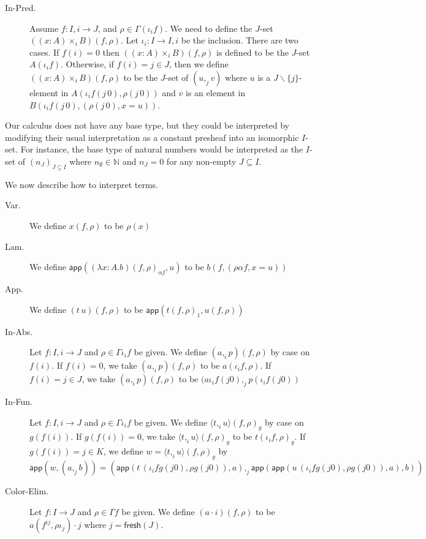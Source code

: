 \documentclass[english]{PaperTools/latex/lipics}
\newcommand\CTimes[2]{(#2) ×_{#1}}
\newcommand\param[1]{\!\cdot\!#1}
\newcommand\fp[3]{⟨#2 ,_{#1} #3⟩}
\def\fresh#1{\mathsf{fresh}(#1)}
\def\app#1#2{\mathsf{app}(#1,#2)}
\begin{document}
\begin{description}
  \item[\sc In-Pred.]
    Assume $f : I,i → J$, and $ρ ∈ Γ(ι_if)$.  We need to define the $J$-set
    $(\CTimes i {x:A} B)(f,ρ)$.
    Let $ι_i : I → I,i$ be the inclusion. There are two cases. If $f(i) = 0$
    then $(\CTimes i {x:A} B)(f,ρ)$ is defined to be the $J$-set $A(ι_i f)$.
    Otherwise, if $f(i) = j ∈ J$, then we define $(\CTimes i {x:A} B)(f,ρ)$ to
    be the $J$-set of $(u,_j v)$ where $u$ is a $J\backslash\{j\}$-element in
    $A(ι_i f(j\,0),ρ(j\,0))$ and $v$ is an element in
    $B(ι_i f(j\,0),(ρ(j\,0),x=u))$.
\end{description}

\begin{remark}
  Our calculus does not have any base type, but they could be interpreted
  by modifying their usual interpretation as a constant presheaf into an
  isomorphic $I$-set.
  For instance, the base type of natural numbers would be interpreted as
  the $I$-set of $(n_J)_{J ⊆ I}$ where $n_∅ ∈ ℕ$ and $n_J = 0$ for any
  non-empty $J ⊆ I$.
\end{remark}

\bigskip
We now describe how to interpret terms.
\begin{description}
  \item[\sc Var.]
    We define $x(f,ρ)$ to be $ρ(x)$

  \item[\sc Lam.]
    We define $\app{(λ x:A.b)(f,ρ)_{α f}}{u}$ to be $b(f,(ρα f,x=u))$

  \item[\sc App.]
    We define $(t\,u)(f,ρ)$ to be $\app{t(f,ρ)_1}{u(f,ρ)}$

  \item[\sc In-Abs.]
    Let $f:I,i → J$ and $ρ ∈ Γι_i f$ be given.
    We define $(a ,_i p)(f,ρ)$ by case on $f(i)$.
    If $f(i) = 0$, we take $(a,_ip)(f,ρ)$ to be $a(ι_i f,ρ)$.
    If $f(i) = j ∈ J$, we take $(a,_ip)(f,ρ)$ to be $(aι_i f(j0),_j p(ι_i f(j0))$

  \item[\sc In-Fun.]
    Let $f:I,i → J$ and $ρ ∈ Γι_i f$ be given.
    We define ${\fp i t u}(f,ρ)_g$ by case on $g(f(i))$.
    If $g(f(i)) = 0$, we take ${\fp i t u}(f,ρ)_g$ to be $t(ι_i f,ρ)_g$.
    If $g(f(i)) = j ∈ K$, we define $w = {\fp i t u}(f,ρ)_g$ by
    $$\app{w}{(a ,_j b)} =
      ( \app{t\,(ι_i fg(j0),ρ g(j0))}{a}
      ,_j
        {\app{\app{u\,(ι_i fg(j0),ρ g(j0))}{a}}{b}}
      )$$

  \item[\sc Color-Elim.]
    Let $f:I → J$ and $ρ ∈ Γ f$ be given.
    We define $(a \param i)(f,ρ)$ to be $a(f^{ij},ρι_j)\param j$
    where $j = \fresh{J}$.
\end{description}
\end{document}
